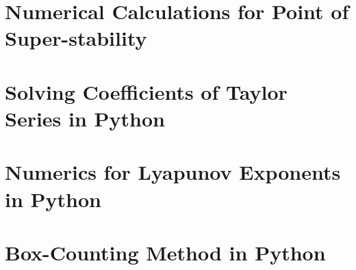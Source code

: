\documentclass[12pt,oneside]{report}
\begin{document}
\begin{appendices}
	\chapter{Numerical Calculations for Point of Super-stability}
	
    \chapter{Solving Coefficients of Taylor Series in Python}
	
    \chapter{Numerics for Lyapunov Exponents in Python}
    
    \chapter{Box-Counting Method in Python}
    
\end{appendices}
\end{document}
